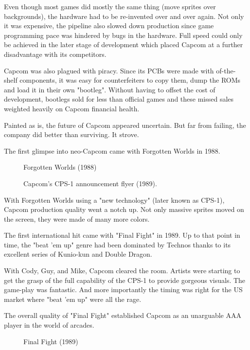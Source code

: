 Even though most games did mostly the same thing (move sprites over backgrounds), the hardware had to be re-invented over and over again. Not only it was expensive, the pipeline also slowed down production since game programming pace was hindered by bugs in the hardware. Full speed could only be achieved in the later stage of development which placed Capcom at a further disadvantage with its competitors.

Capcom was also plagued with piracy. Since its PCBs were made with of-the-shelf components, it was easy for counterfeiters to copy them, dump the ROMs and load it in their own "bootleg". Without having to offset the cost of development, bootlegs sold for less than official games and these missed sales weighted heavily on Capcom financial health.


Painted as is, the future of Capcom appeared uncertain. But far from failing, the company did better than surviving. It strove.

 The first glimpse into neo-Capcom came with Forgotten Worlds in 1988.

 \begin{figure}[H]
\caption*{Forgotten Worlds (1988)}
\end{figure}

  \begin{figure}[H]
  \caption*{Capcom's CPS-1 announcement flyer (1989).}
  \end{figure}

 With Forgotten Worlds using a "new technology" (later known as CPS-1), Capcom production quality went a notch up. Not only massive sprites moved on the screen, they were made of many more colors.

The first international hit came with "Final Fight" in 1989. Up to that point in time, the "beat 'em up" genre had been dominated by Technos thanks to its excellent series of Kunio-kun and Double Dragon. 

With Cody, Guy, and Mike, Capcom cleared the room. Artists were starting to get the grasp of the full capability of the CPS-1 to provide gorgeous visuals. The game-play was fantastic. And more importantly the timing was right for the US market where "beat 'em up" were all the rage.

 
The overall quality of "Final Fight" established Capcom as an unarguable AAA player in the world of arcades.

  

\label{nin_ff}
 \begin{figure}[H]
\caption*{Final Fight (1989)}
\end{figure}

